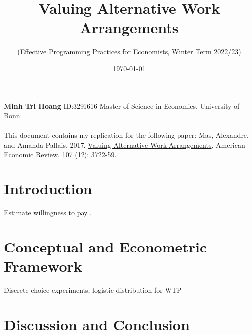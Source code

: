 \documentclass[11pt]{article}
\begin{document}
\title{\textbf{Valuing Alternative Work Arrangements}}
\author{(Effective Programming Practices for Economists, Winter Term 2022/23)}
\date{\today}

\maketitle
\textbf{Minh Tri Hoang} \textbar{} ID:3291616 \textbar{} Master of Science in Economics, University of Bonn \\ \\
This document contains my replication for the following paper: Mas, Alexandre, and Amanda Pallais. 2017. \href{https://www.aeaweb.org/articles?id=10.1257/aer.20161500}{Valuing Alternative Work Arrangements}. American Economic Review. 107 (12): 3722-59.

\tableofcontents

\pagebreak

\hypertarget{introduction}{%
\section{Introduction}\label{introduction}}

Estimate willingness to pay \cite{10.1257/aer.20161500}.

\hypertarget{Conceptual and Econometric Framework}{%
\section{Conceptual and Econometric Framework}\label{Conceptual and Econometric Framework}}

Discrete choice experiments, logistic distribution for WTP

\hypertarget{Discussion and Conclusion}{%
\section{Discussion and Conclusion}\label{Discussion and Conclusion}}




\end{document}
